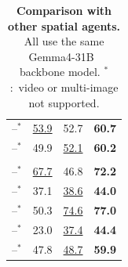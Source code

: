 \begin{table}[t]
{\begin{tabular}[t]{cccc}
  --$^{*}$ & \cellcolor{secondcell}\underline{53.9} & 52.7 & \cellcolor{bestcell}\textbf{60.7} \\
  --$^{*}$ & 49.9 & \cellcolor{secondcell}\underline{52.1} & \cellcolor{bestcell}\textbf{60.2} \\
  \midrule
  \multicolumn{4}{c}{\strut} \\
  --$^{*}$ & \cellcolor{secondcell}\underline{67.7} & 46.8 & \cellcolor{bestcell}\textbf{72.2} \\
  --$^{*}$ & 37.1 & \cellcolor{secondcell}\underline{38.6} & \cellcolor{bestcell}\textbf{44.0} \\
  --$^{*}$ & 50.3 & \cellcolor{secondcell}\underline{74.6} & \cellcolor{bestcell}\textbf{77.0} \\
  --$^{*}$ & 23.0 & \cellcolor{secondcell}\underline{37.4} & \cellcolor{bestcell}\textbf{44.4} \\
  \midrule
  --$^{*}$ & 47.8 & \cellcolor{secondcell}\underline{48.7} & \cellcolor{bestcell}\textbf{59.9} \\
  \bottomrule
  \end{tabular}%
}

\setlength{\actionLcap}{(\linewidth-8pt) * \ratio{\wd\actionLBox}{\wd\actionLBox+\wd\actionRBox}}
\setlength{\actionRcap}{(\linewidth-8pt) * \ratio{\wd\actionRBox}{\wd\actionLBox+\wd\actionRBox}}

\begin{minipage}[t]{\actionLcap}
\caption{\textbf{Action interface comparison.} All variants use the same toolset. ``Structured Tool-Call'' exposes the tools through a JSON command interface~\citep{chen2025spacetools}. ``Single-Pass Code'' generates one complete program before execution.}
\label{tab:action_interface}
\end{minipage}%
\hspace{8pt}%
\begin{minipage}[t]{\actionRcap}
\caption{\textbf{Comparison with other spatial agents.} All
use the same Gemma4-31B~\citep{gemma4} backbone model. 
 $^{*}$:~video or multi-image not supported.}
\label{tab:comparison_agents}
\end{minipage}

\resizebox{\linewidth}{!}{\usebox{\actionLBox}\hspace{8pt}\usebox{\actionRBox}}

\end{table}
